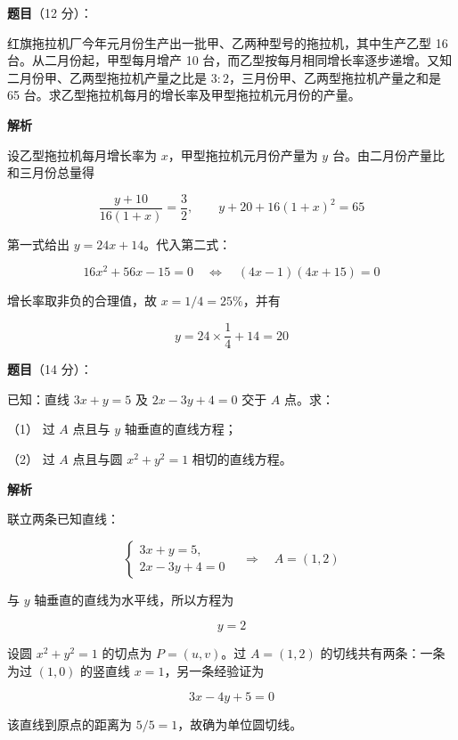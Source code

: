 \begin{answer}

\textbf{题目}（12 分）：

红旗拖拉机厂今年元月份生产出一批甲、乙两种型号的拖拉机，其中生产乙型 16 台。从二月份起，甲型每月增产 10 台，而乙型按每月相同增长率逐步递增。又知二月份甲、乙两型拖拉机产量之比是 $3:2$，三月份甲、乙两型拖拉机产量之和是 65 台。求乙型拖拉机每月的增长率及甲型拖拉机元月份的产量。

\textbf{解析}

设乙型拖拉机每月增长率为 $x$，甲型拖拉机元月份产量为 $y$ 台。由二月份产量比和三月份总量得

\nopagebreak[4]
\[
\frac{y+10}{16(1+x)}=\frac32,
\qquad
y+20+16(1+x)^2=65
\]

第一式给出 $y=24x+14$。代入第二式：

\nopagebreak[4]
\[
16x^2+56x-15=0
\quad\Longleftrightarrow\quad
(4x-1)(4x+15)=0
\]

增长率取非负的合理值，故 $x=1/4=25\%$，并有

\nopagebreak[4]
\[
y=24\times\frac14+14=20
\]


\end{answer}
\begin{answer}

\textbf{题目}（14 分）：

已知：直线 $3x+y=5$ 及 $2x-3y+4=0$ 交于 $A$ 点。求：

（1） 过 $A$ 点且与 $y$ 轴垂直的直线方程；

（2） 过 $A$ 点且与圆 $x^2+y^2=1$ 相切的直线方程。

\textbf{解析}

联立两条已知直线：

\nopagebreak[4]
\[
\begin{cases}
3x+y=5,\\
2x-3y+4=0
\end{cases}
\quad\Longrightarrow\quad A=(1,2)
\]


与 $y$ 轴垂直的直线为水平线，所以方程为

\nopagebreak[4]
\[
y=2
\]


设圆 $x^2+y^2=1$ 的切点为 $P=(u,v)$。过 $A=(1,2)$ 的切线共有两条：一条为过 $(1,0)$ 的竖直线 $x=1$，另一条经验证为

\nopagebreak[4]
\[
3x-4y+5=0
\]

该直线到原点的距离为 $5/5=1$，故确为单位圆切线。



\end{answer}
